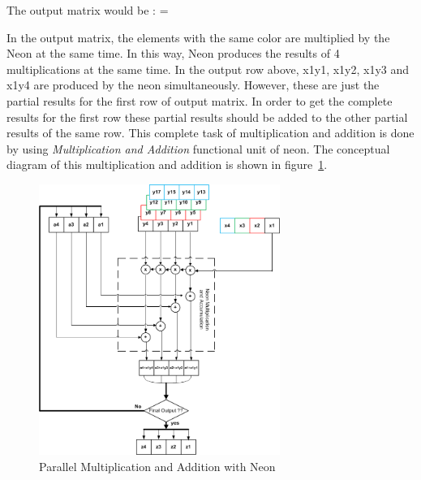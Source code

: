 The output matrix would be : 
=
\begin{table}[h]
\end{table}

In the output matrix, the elements with the same color are multiplied by the Neon at the same time. In this way, Neon produces the results of 4 multiplications at the same time. In the output row above, x1y1, x1y2, x1y3 and x1y4 are produced by the neon simultaneously. However, these are just the partial results for the first row of output matrix. In order to get the complete results for the first row these partial results should be added to the other partial results of the same row. This complete task of multiplication and addition is done by using \emph{Multiplication and Addition} functional unit of neon. The conceptual diagram of this multiplication and addition is shown in figure~\ref{fig:neon_mult_add}.

\begin{figure}[h]
\centering 
\includegraphics[width= 0.7\textwidth]{images/MandA}
\caption{Parallel Multiplication and Addition with Neon  }
\label{fig:neon_mult_add}
\end{figure}
